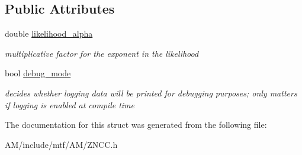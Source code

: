\subsection*{Public Attributes}
\begin{DoxyCompactItemize}
\item 
\hypertarget{structZNCCParams_aecf018afbe10fb4062ea0a0993bfb127}{double \hyperlink{structZNCCParams_aecf018afbe10fb4062ea0a0993bfb127}{likelihood\-\_\-alpha}}\label{structZNCCParams_aecf018afbe10fb4062ea0a0993bfb127}

\begin{DoxyCompactList}\small\item\em multiplicative factor for the exponent in the likelihood \end{DoxyCompactList}\item 
\hypertarget{structZNCCParams_a89f798a0dca5d948a55d903a215798f2}{bool \hyperlink{structZNCCParams_a89f798a0dca5d948a55d903a215798f2}{debug\-\_\-mode}}\label{structZNCCParams_a89f798a0dca5d948a55d903a215798f2}

\begin{DoxyCompactList}\small\item\em decides whether logging data will be printed for debugging purposes; only matters if logging is enabled at compile time \end{DoxyCompactList}\end{DoxyCompactItemize}


The documentation for this struct was generated from the following file\-:\begin{DoxyCompactItemize}
\item 
A\-M/include/mtf/\-A\-M/Z\-N\-C\-C.\-h\end{DoxyCompactItemize}
